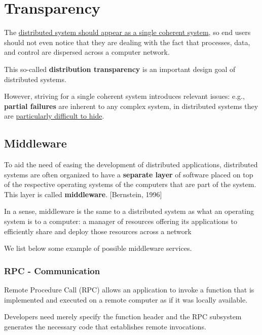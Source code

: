 \section{Transparency}
The \ul{distributed system should appear as a single coherent system}, so end users should not even notice that they are dealing with the fact that processes, data, and control are dispersed across a computer network.


This so-called \textbf{distribution transparency} is an important design goal of distributed systems.


However, striving for a single coherent system introduces relevant issues: 
e.g., \textbf{partial failures} are inherent to any complex system, in distributed systems they are \ul{particularly difficult to hide}.

\subsection{Middleware}

To aid the need of easing the development of distributed applications, distributed systems are often organized to have a \textbf{separate layer} of software placed on top of the respective operating systems of the computers that are part of the system.\\
This layer is called \textbf{middleware}. [Bernstein, 1996]

In a sense, middleware is the same to a distributed system as what an operating system is to a computer:
a manager of resources offering its applications to efficiently share and deploy those resources across a network

We list below some example of possible middleware services.

\subsubsection{RPC - Communication}

Remote Procedure Call (RPC) allows an application to invoke a function that is implemented and executed on a remote computer as if it was locally available.

Developers need merely specify the function header and the RPC subsystem generates the necessary code that establishes remote invocations. 


